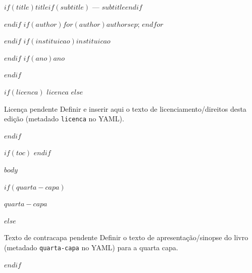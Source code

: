 \begin{fichacatalografica}
$if(title)$\textbf{$title$}$if(subtitle)$ --- $subtitle$$endif$\par$endif$
$if(author)$$for(author)$$author$$sep$; $endfor$\par$endif$
$if(instituicao)$$instituicao$\par$endif$
$if(ano)$$ano$\par$endif$
\medskip

$if(licenca)$
$licenca$
$else$
\begin{conteudopendente}{Licença pendente}
Definir e inserir aqui o texto de licenciamento/direitos desta edição (metadado \texttt{licenca} no YAML).
\end{conteudopendente}
$endif$
\end{fichacatalografica}

$if(toc)$
\tableofcontents
$endif$

\mainmatter

$body$

\clearpage
\thispagestyle{empty}
$if(quarta-capa)$
\vspace*{\fill}
\begin{center}
$quarta-capa$
\end{center}
\vspace*{\fill}
$else$
\begin{conteudopendente}{Texto de contracapa pendente}
Definir o texto de apresentação/sinopse do livro (metadado \texttt{quarta-capa} no YAML) para a quarta capa.
\end{conteudopendente}
$endif$


